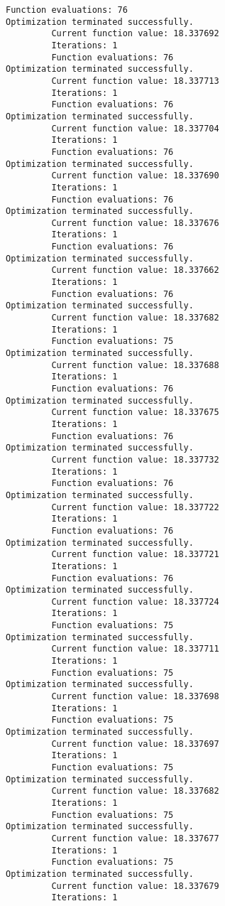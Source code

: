 \documentclass[11pt]{article}
\begin{document}
\begin{Verbatim}[commandchars=\\\{\}]
         Function evaluations: 76
Optimization terminated successfully.
         Current function value: 18.337692
         Iterations: 1
         Function evaluations: 76
Optimization terminated successfully.
         Current function value: 18.337713
         Iterations: 1
         Function evaluations: 76
Optimization terminated successfully.
         Current function value: 18.337704
         Iterations: 1
         Function evaluations: 76
Optimization terminated successfully.
         Current function value: 18.337690
         Iterations: 1
         Function evaluations: 76
Optimization terminated successfully.
         Current function value: 18.337676
         Iterations: 1
         Function evaluations: 76
Optimization terminated successfully.
         Current function value: 18.337662
         Iterations: 1
         Function evaluations: 76
Optimization terminated successfully.
         Current function value: 18.337682
         Iterations: 1
         Function evaluations: 75
Optimization terminated successfully.
         Current function value: 18.337688
         Iterations: 1
         Function evaluations: 76
Optimization terminated successfully.
         Current function value: 18.337675
         Iterations: 1
         Function evaluations: 76
Optimization terminated successfully.
         Current function value: 18.337732
         Iterations: 1
         Function evaluations: 76
Optimization terminated successfully.
         Current function value: 18.337722
         Iterations: 1
         Function evaluations: 76
Optimization terminated successfully.
         Current function value: 18.337721
         Iterations: 1
         Function evaluations: 76
Optimization terminated successfully.
         Current function value: 18.337724
         Iterations: 1
         Function evaluations: 75
Optimization terminated successfully.
         Current function value: 18.337711
         Iterations: 1
         Function evaluations: 75
Optimization terminated successfully.
         Current function value: 18.337698
         Iterations: 1
         Function evaluations: 75
Optimization terminated successfully.
         Current function value: 18.337697
         Iterations: 1
         Function evaluations: 75
Optimization terminated successfully.
         Current function value: 18.337682
         Iterations: 1
         Function evaluations: 75
Optimization terminated successfully.
         Current function value: 18.337677
         Iterations: 1
         Function evaluations: 75
Optimization terminated successfully.
         Current function value: 18.337679
         Iterations: 1

\end{Verbatim}
\end{document}
